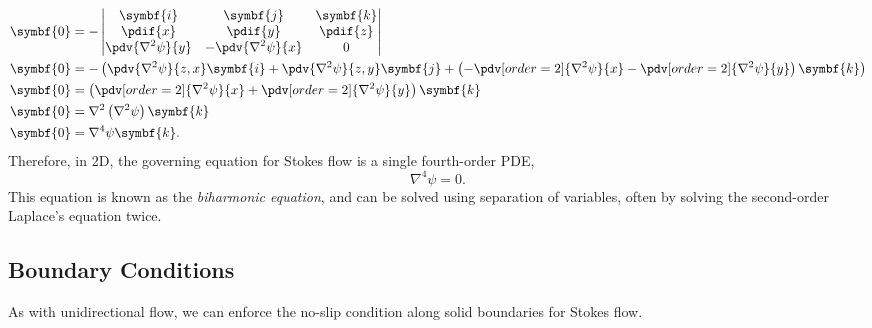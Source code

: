 \documentclass{article}
\theoremstyle{definition}
\begin{document}
\begin{align*}
    \symbf{0} & = -
    \begin{vmatrix}
        \symbf{i}              & \symbf{j}              & \symbf{k}              \\
        \displaystyle \pdif{x} & \displaystyle \pdif{y} & \displaystyle \pdif{z} \\
        \displaystyle \pdv{\nabla^2 \psi}{y} & \displaystyle -\pdv{\nabla^2 \psi}{x} & 0
    \end{vmatrix}
    \\
    \symbf{0} & = - \left( \pdv{\nabla^2 \psi}{z,x} \symbf{i} + \pdv{\nabla^2 \psi}{z,y} \symbf{j} + \left( - \pdv[order=2]{\nabla^2 \psi}{x} - \pdv[order=2]{\nabla^2 \psi}{y} \right) \symbf{k} \right) \\
    \symbf{0} & = \left( \pdv[order=2]{\nabla^2 \psi}{x} + \pdv[order=2]{\nabla^2 \psi}{y} \right) \symbf{k} \\
    \symbf{0} & = \nabla^2 \left( \nabla^2 \psi \right) \symbf{k} \\
    \symbf{0} & = \nabla^4 \psi \symbf{k}.
\end{align*}
\endgroup
Therefore, in 2D, the governing equation for Stokes flow is a single
fourth-order PDE,
\begin{equation*}
    \nabla^4 \psi = 0.
\end{equation*}
This equation is known as the \textit{biharmonic equation}, and can be
solved using separation of variables, often by solving the second-order
Laplace's equation twice.
\subsection{Boundary Conditions}
As with unidirectional flow, we can enforce the no-slip condition along
solid boundaries for Stokes flow.
\end{document}
